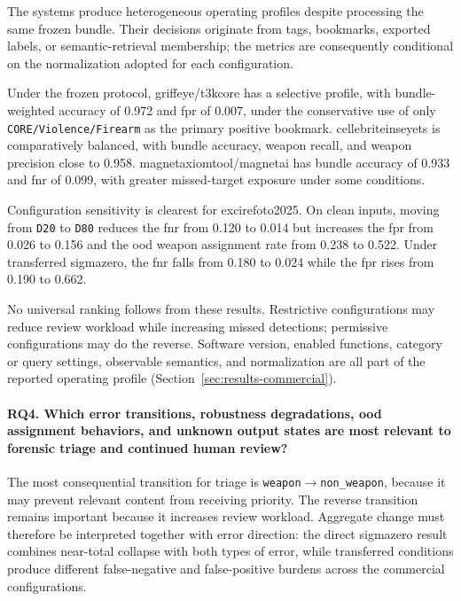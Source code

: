 The systems produce heterogeneous operating profiles despite processing the
same frozen bundle. Their decisions originate from tags, bookmarks, exported
labels, or semantic-retrieval membership; the metrics are consequently
conditional on the normalization adopted for each configuration.

Under the frozen protocol, \gls{griffeye}/\gls{t3kcore} has a selective
profile, with bundle-weighted accuracy of 0.972 and \gls{fpr} of 0.007, under
the conservative use of only \texttt{CORE/Violence/Firearm} as the primary
positive bookmark. \gls{cellebriteinseyets} is comparatively balanced, with
bundle accuracy, weapon recall, and weapon precision close to 0.958.
\gls{magnetaxiomtool}/\gls{magnetai} has bundle accuracy of 0.933 and
\gls{fnr} of 0.099, with greater missed-target exposure under some conditions.

Configuration sensitivity is clearest for \gls{excirefoto2025}. On clean
inputs, moving from \texttt{D20} to \texttt{D80} reduces the \gls{fnr} from
0.120 to 0.014 but increases the \gls{fpr} from 0.026 to 0.156 and the
\gls{ood} weapon assignment rate from 0.238 to 0.522. Under transferred
\gls{sigmazero}, the \gls{fnr} falls from 0.180 to 0.024 while the \gls{fpr}
rises from 0.190 to 0.662.

No universal ranking follows from these results. Restrictive configurations
may reduce review workload while increasing missed detections; permissive
configurations may do the reverse. Software version, enabled functions,
category or query settings, observable semantics, and normalization are all
part of the reported operating profile
(Section~\ref{sec:results-commercial}).

\paragraph{\textbf{RQ4. Which error transitions, robustness degradations,
\gls{ood} assignment behaviors, and unknown output states are most relevant
to forensic triage and continued human review?}}

The most consequential transition for triage is
\texttt{weapon}\(\rightarrow\)\texttt{non\_weapon}, because it may prevent
relevant content from receiving priority. The reverse transition remains
important because it increases review workload. Aggregate change must therefore
be interpreted together with error direction: the direct \gls{sigmazero}
result combines near-total collapse with both types of error, while transferred
conditions produce different false-negative and false-positive burdens across
the commercial configurations.

